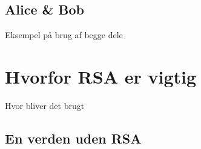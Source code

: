 \documentclass[a4paper, 12pt]{article}
\begin{document}
    \subsection{Alice \& Bob}
    Eksempel på brug af begge dele



\section{Hvorfor RSA er vigtig}
Hvor bliver det brugt

    \subsection{En verden uden RSA}





\newpage
\printbibliography[heading=bibintoc, title={Litteratur}]
\end{document}
